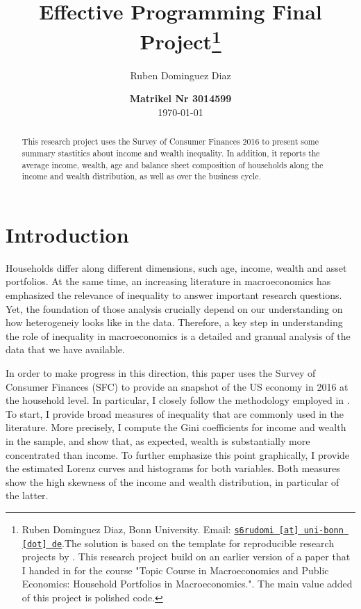 \documentclass[11pt, a4paper, leqno]{article}
\begin{document}
\title{Effective Programming Final Project\thanks{Ruben Dominguez Diaz, Bonn University. Email: \href{mailto:s6rudomi@uni-bonn.de}{\nolinkurl{s6rudomi [at] uni-bonn [dot] de}}.The solution is based on the template for reproducible research projects by \citet{GaudeckerEconProjectTemplates}. This research project build on an earlier version of a paper that I handed in for the course "Topic Course in Macroeconomics and Public Economics: Household Portfolios in Macroeconomics.". The main value added of this project is polished code.} }

\author{Ruben Dominguez Diaz}

\date{
{\bf Matrikel Nr 3014599} 
\\[1ex] 
\today
}

\maketitle

\begin{abstract}
	This research project uses the Survey of Consumer Finances 2016 to present some summary stastitics about income and wealth inequality. In addition, it reports the average income, wealth, age and balance sheet composition of households along the income and wealth distribution, as well as over the business cycle.
\end{abstract}
\clearpage

\section{Introduction} 
\label{sec:introduction}
    Households differ along different dimensions, such age, income, wealth and asset portfolios. At the same time, an increasing literature in macroeconomics has emphasized the relevance of inequality to answer important research questions. Yet, the foundation of those analysis crucially depend on our understanding on how heterogeneiy looks like in the data. Therefore, a key step in understanding the role of inequality in macroeconomics is a detailed and granual analysis of the data that we have available.

    In order to make progress in this direction, this paper uses the Survey of Consumer Finances (SFC) to provide an snapshot of the US economy in 2016 at the household level. In particular, I closely follow the methodology employed in \citet{Kuhn2016}. To start, I provide broad measures of inequality that are commonly used in the literature. More precisely, I compute the Gini coefficients for income and wealth in the sample, and show that, as expected, wealth is substantially more concentrated than income. To further emphasize this point graphically, I provide the estimated Lorenz curves and histograms for both variables. Both measures show the high skewness of the income and wealth distribution, in particular of the latter.
\end{document}
